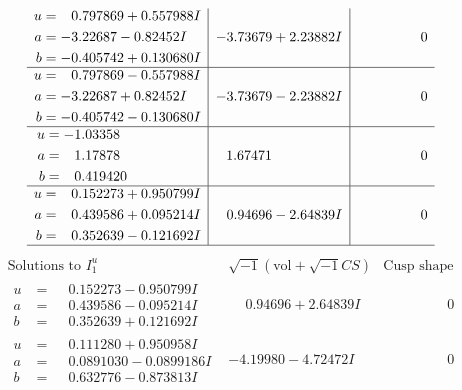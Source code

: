 \documentclass[1p]{elsarticle_modified}
\theoremstyle{definition}
\newcommand{\I}{\sqrt{-1}}
\begin{document}
$$\begin{array}{c|c|c}
\begin{aligned}
u &= \phantom{-}0.797869 + 0.557988 I \\
a &= -3.22687 - 0.82452 I \\
b &= -0.405742 + 0.130680 I\end{aligned}
 & -3.73679 + 2.23882 I & \phantom{-0.000000 } 0 \\ \hline\begin{aligned}
u &= \phantom{-}0.797869 - 0.557988 I \\
a &= -3.22687 + 0.82452 I \\
b &= -0.405742 - 0.130680 I\end{aligned}
 & -3.73679 - 2.23882 I & \phantom{-0.000000 } 0 \\ \hline\begin{aligned}
u &= -1.03358\phantom{ +0.000000I} \\
a &= \phantom{-}1.17878\phantom{ +0.000000I} \\
b &= \phantom{-}0.419420\phantom{ +0.000000I}\end{aligned}
 & \phantom{-}1.67471\phantom{ +0.000000I} & \phantom{-0.000000 } 0 \\ \hline\begin{aligned}
u &= \phantom{-}0.152273 + 0.950799 I \\
a &= \phantom{-}0.439586 + 0.095214 I \\
b &= \phantom{-}0.352639 - 0.121692 I\end{aligned}
 & \phantom{-}0.94696 - 2.64839 I & \phantom{-0.000000 } 0\\
 \hline 
 \end{array}$$\newpage$$\begin{array}{c|c|c}  
\text{Solutions to }I^u_{1}& \I (\text{vol} + \sqrt{-1}CS) & \text{Cusp shape}\\
 \hline 
\begin{aligned}
u &= \phantom{-}0.152273 - 0.950799 I \\
a &= \phantom{-}0.439586 - 0.095214 I \\
b &= \phantom{-}0.352639 + 0.121692 I\end{aligned}
 & \phantom{-}0.94696 + 2.64839 I & \phantom{-0.000000 } 0 \\ \hline\begin{aligned}
u &= \phantom{-}0.111280 + 0.950958 I \\
a &= \phantom{-}0.0891030 - 0.0899186 I \\
b &= \phantom{-}0.632776 - 0.873813 I\end{aligned}
 & -4.19980 - 4.72472 I & \phantom{-0.000000 } 0 \\ \hline\begin{aligned}

\end{aligned}
\end{array}$$
\end{document}
